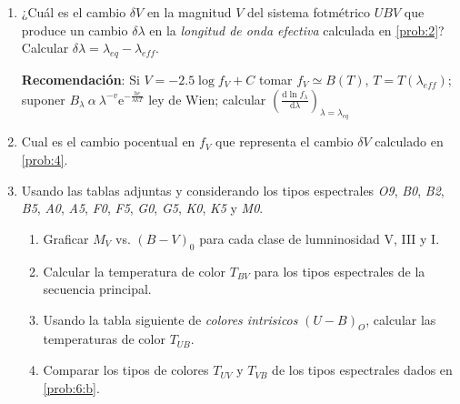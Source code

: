 \documentclass[10pt,spanish,a4paper,1p]{practice}
\begin{document}
\begin{enumerate}[wide, labelwidth=!, labelindent=0pt, label=\textbf{\textrm{\arabic*)}}, ref=\arabic*]
    \item \label{prob:4} ¿Cuál es el cambio $\delta V$ en la magnitud $V$ del sistema fotmétrico $UBV$ que produce un cambio $\delta\lambda$ en la \emph{longitud de onda efectiva} calculada en \ref{prob:2}? Calcular $\delta\lambda = {\lambda}_{eq} - {\lambda}_{eff}$.

    \textbf{Recomendación}:
        Si $V = -2.5 \log f_V + C$ tomar $f_V \simeq B\left(T\right) $, $T=T\left({\lambda}_{eff}\right)$; suponer $B_{\lambda}\ \alpha\ {\lambda}^{-v} \mathrm{e}^{-\frac{hc}{\lambda k T}}$ ley de Wien; calcular $\left(\frac{\mathrm{d} \ln {f}_{\lambda}}{\mathrm{d}\lambda}\right)_{\lambda = {\lambda}_{eq}}$

    \item \label{prob:5} Cual es el cambio pocentual en $f_V$ que representa el cambio $\delta V$ calculado en \ref{prob:4}.

    \item \label{prob:6} Usando las tablas adjuntas y considerando los tipos espectrales \emph{O9},
    \emph{B0}, \emph{B2}, \emph{B5}, \emph{A0}, \emph{A5}, \emph{F0}, \emph{F5}, \emph{G0}, \emph{G5}, \emph{K0}, \emph{K5} y \emph{M0}.

        \begin{enumerate}
            \item Graficar $M_V$ vs. $\left(B-V\right)_{0}$ para cada clase de lumninosidad V, III y I.

            \item \label{prob:6:a} Calcular la temperatura de color $T_{BV}$ para los tipos espectrales de la secuencia principal.

            \item \label{prob:6:b} Usando la tabla siguiente de \emph{colores intrisicos} $\left(U-B\right)_O$, calcular las temperaturas de color $T_{UB}$.

            \item \label{prob:6:c} Comparar los tipos de colores $T_{UV}$ y $T_{VB}$ de los tipos espectrales dados en \ref{prob:6:b}.


\end{enumerate}
\end{enumerate}
\end{document}
